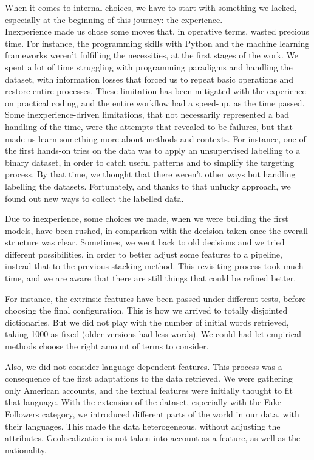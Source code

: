 When it comes to internal choices, we have to start with something we lacked, especially at the beginning of this journey: the experience.\\
Inexperience made us chose some moves that, in operative terms, wasted precious time.
For instance, the programming skills with Python and the machine learning frameworks weren't fulfilling the necessities, at the first stages of the work.
We spent a lot of time struggling with programming paradigms and handling the dataset, with information losses that forced us to repeat basic operations and restore entire processes.
These limitation has been mitigated with the experience on practical coding, and the entire workflow had a speed-up, as the time passed.
Some inexperience-driven limitations, that not necessarily represented a bad handling of the time, were the attempts that revealed to be failures, but that made us learn something more about methods and contexts.
For instance, one of the first hands-on tries on the data was to apply an unsupervised labelling to a binary dataset, in order to catch useful patterns and to simplify the targeting process. By that time, we thought that there weren't other ways but handling labelling the datasets. Fortunately, and thanks to that unlucky approach, we found out new ways to collect the labelled data.

Due to inexperience, some choices we made, when we were building the first models, have been rushed, in comparison with the decision taken once the overall structure was clear. Sometimes, we went back to old decisions and we tried different possibilities, in order to better adjust some features to a pipeline, instead that to the previous stacking method. This revisiting process took much time, and we are aware that there are still things that could be refined better.

For instance, the extrinsic features have been passed under different tests, before choosing the final configuration. This is how we arrived to totally disjointed dictionaries. But we did not play with the number of initial words retrieved, taking 1000 as fixed (older versions had less words). We could had let empirical methods choose the right amount of terms to consider.

Also, we did not consider language-dependent features. This process was a consequence of the first adaptations to the data retrieved. We were gathering only American accounts, and the textual features were initially thought to fit that language.
With the extension of the dataset, especially with the Fake-Followers category, we introduced different parts of the world in our data, with their languages. This made the data heterogeneous, without adjusting the attributes. Geolocalization is not taken into account as a feature, as well as the nationality. 

